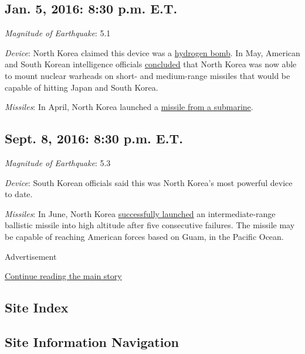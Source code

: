 \hypertarget{jan-5-2016-830-pm-et}{%
\subsection{Jan. 5, 2016: 8:30 p.m. E.T.}\label{jan-5-2016-830-pm-et}}

\emph{Magnitude of Earthquake}: 5.1

\emph{Device}: North Korea claimed this device was a
\href{http://www.nytimes.com/2016/01/06/world/asia/north-korea-hydrogen-bomb-test.html}{hydrogen
bomb}. In May, American and South Korean intelligence officials
\href{http://www.nytimes.com/2016/05/07/world/asia/north-korea-nuclear-us-strategy.html}{concluded}
that North Korea was now able to mount nuclear warheads on short- and
medium-range missiles that would be capable of hitting Japan and South
Korea.

\emph{Missiles}: In April, North Korea launched a
\href{http://www.nytimes.com/2016/08/24/world/asia/north-korea-submarine-missile.html}{missile
from a submarine}.

\hypertarget{sept-8-2016-830-pm-et}{%
\subsection{Sept. 8, 2016: 8:30 p.m. E.T.}\label{sept-8-2016-830-pm-et}}

\emph{Magnitude of Earthquake}: 5.3

\emph{Device}: South Korean officials said this was North Korea's most
powerful device to date.

\emph{Missiles}: In June, North Korea
\href{http://www.nytimes.com/2016/06/23/world/asia/north-korea-missile-test.html}{successfully
launched} an intermediate-range ballistic missile into high altitude
after five consecutive failures. The missile may be capable of reaching
American forces based on Guam, in the Pacific Ocean.

Advertisement

\protect\hyperlink{after-bottom}{Continue reading the main story}

\hypertarget{site-index}{%
\subsection{Site Index}\label{site-index}}

\hypertarget{site-information-navigation}{%
\subsection{Site Information
Navigation}\label{site-information-navigation}}

